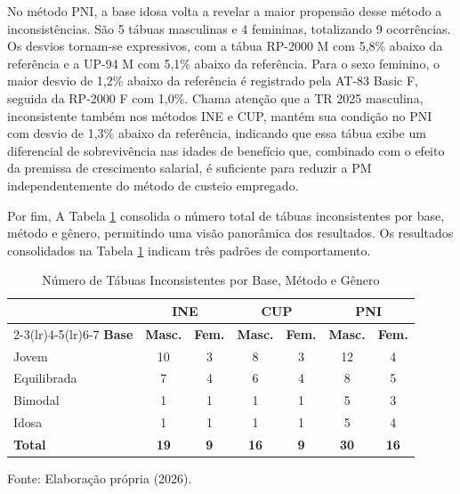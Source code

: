 No método PNI, a base idosa volta a revelar a maior propensão desse método a inconsistências. São 5 tábuas masculinas e 4 femininas, totalizando 9 ocorrências. Os desvios tornam-se expressivos, com a tábua RP-2000 M com 5,8\% abaixo da referência e a UP-94 M com 5,1\% abaixo da referência. Para o sexo feminino, o maior desvio de 1,2\% abaixo da referência é registrado pela AT-83 Basic F, seguida da RP-2000 F com 1,0\%. Chama atenção que a TR 2025 masculina, inconsistente também nos métodos INE e CUP, mantém sua condição no PNI com desvio de 1,3\% abaixo da referência, indicando que essa tábua exibe um diferencial de sobrevivência nas idades de benefício que, combinado com o efeito da premissa de crescimento salarial, é suficiente para reduzir a PM independentemente do método de custeio empregado.

Por fim, A Tabela \ref{tab:sintese_inconsistencias} consolida o número total de tábuas inconsistentes por base, método e gênero, permitindo uma visão panorâmica dos resultados. Os resultados consolidados na Tabela \ref{tab:sintese_inconsistencias} indicam três padrões de comportamento.
\newpage 

\begin{table}[htbp]
    \centering
    \caption{Número de Tábuas Inconsistentes por Base, Método e Gênero}
    \begin{threeparttable}
    \renewcommand{\arraystretch}{1.1}
    \begin{tabular}{lcccccc}
    \toprule
    & \multicolumn{2}{c}{\textbf{INE}} & \multicolumn{2}{c}{\textbf{CUP}} & \multicolumn{2}{c}{\textbf{PNI}} \\
    \cmidrule(lr){2-3}\cmidrule(lr){4-5}\cmidrule(lr){6-7}
    \textbf{Base} & \textbf{Masc.} & \textbf{Fem.} & \textbf{Masc.} & \textbf{Fem.} & \textbf{Masc.} & \textbf{Fem.} \\
    \midrule
    Jovem       & 10 & 3 & 8 & 3 & 12 & 4 \\
    Equilibrada &  7 & 4 & 6 & 4 &  8 & 5 \\
    Bimodal     &  1 & 1 & 1 & 1 &  5 & 3 \\
    Idosa       &  1 & 1 & 1 & 1 &  5 & 4 \\
    \midrule
    \textbf{Total} & \textbf{19} & \textbf{9} & \textbf{16} & \textbf{9} & \textbf{30} & \textbf{16} \\
    \bottomrule
    \end{tabular}
    \begin{tablenotes}[flushleft]
        \small
        \item Fonte: Elaboração própria (2026).
    \end{tablenotes}
    \end{threeparttable}
    \label{tab:sintese_inconsistencias}
\end{table}

